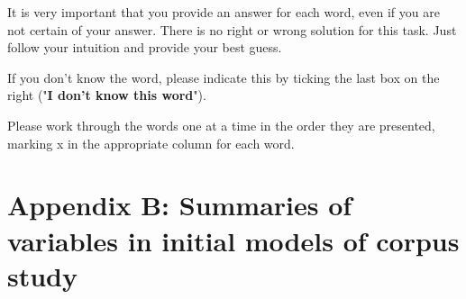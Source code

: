 It is very important that you provide an answer for each word, even if you are not certain of your answer. There is no right or wrong solution for this task. Just follow your intuition and provide your best guess.



If you don’t know the word, please indicate this by ticking the last box on the right ("\textbf{I don't know this word}").



Please work through the words one at a time in the order they are presented, marking x in the appropriate column for each word.\\



\clearpage



\section*{Appendix B: Summaries of variables in initial models of corpus study}\label{App B: Summaries of variables in initial models of corpus study}


